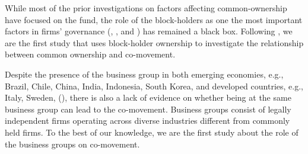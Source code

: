 \documentclass[12pt, a4paper]{article}
\begin{document}

While most of the prior investigations on factors affecting common-ownership have focused on the fund, the role of the block-holders as one the most important factors in firms' governance (\cite{holderness2003survey}, \cite{edmans2014blockholders}, and \cite{edmans2017blockholders}) has remained a black box. Following \cite{AntonPolk}, we are the first study that uses block-holder ownership to investigate the relationship between common ownership and co-movement.

Despite the presence of the business group in both emerging economies, e.g., Brazil, Chile, China, India, Indonesia, South Korea, and developed countries, e.g., Italy, Sweden, (\cite{khanna2007business}), there is also a lack of evidence on whether being at the same business group can lead to the co-movement. Business groups consist of legally independent firms operating across diverse industries different from commonly held firms. To the best of our knowledge, we are the first study about the role of the business groups on co-movement. 
	
	
\end{document}
